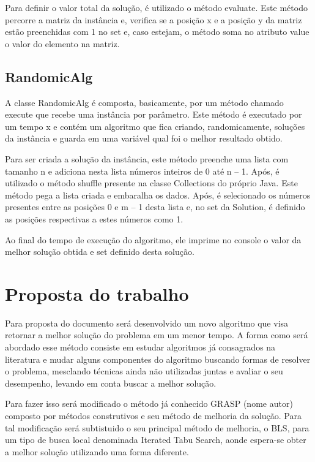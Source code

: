 \documentclass[12pt]{article}
\begin{document}
Para definir o valor total da solução, é utilizado o método evaluate. Este método percorre a matriz da instância e, verifica se a posição x e a posição y da matriz estão preenchidas com 1 no set e, caso estejam, o método soma no atributo value o valor do elemento na matriz.

\subsection{RandomicAlg}

A classe RandomicAlg é composta, basicamente, por um método chamado execute que recebe uma instância por parâmetro. Este método é executado por um tempo x e contém um algoritmo que fica criando, randomicamente, soluções da instância e guarda em uma variável qual foi o melhor resultado obtido.

Para ser criada a solução da instância, este método preenche uma lista com tamanho n e adiciona nesta lista números inteiros de 0 até n – 1. Após, é utilizado o método shuffle presente na classe Collections do próprio Java. Este método pega a lista criada e embaralha os dados. Após, é selecionado os números presentes entre as posições 0 e m – 1 desta lista e, no set da Solution, é definido as posições respectivas a estes números como 1. 

Ao final do tempo de execução do algoritmo, ele imprime no console o valor da melhor solução obtida e set definido desta solução.

\section{Proposta do trabalho}

Para proposta do documento será desenvolvido um novo algoritmo que visa retornar a melhor solução do problema em um menor tempo. A forma como será abordado esse método consiste em estudar algoritmos já consagrados na literatura e mudar alguns componentes do algoritmo buscando formas de resolver o problema, mesclando técnicas ainda não utilizadas juntas e avaliar o seu desempenho, levando em conta buscar a melhor solução.

Para fazer isso será modificado o método já conhecido GRASP (nome autor) composto por métodos construtivos e seu método de melhoria da solução. Para tal modificação será subtistuido o seu principal método de melhoria, o BLS, para um tipo de busca local denominada Iterated Tabu Search, aonde espera-se obter a melhor solução utilizando uma forma diferente.
\end{document}
